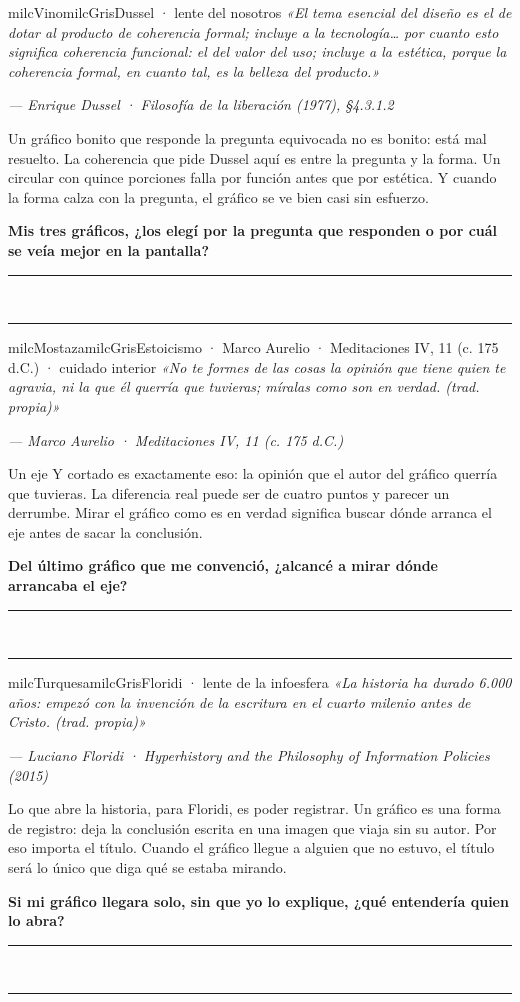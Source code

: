 \documentclass[11pt,letterpaper]{article}
\newcommand{\linead}[1]{\noindent\color{milcLinea}\rule{#1}{0.5pt}\color{milcNegro}}
\begin{document}
\begin{softbox}{milcVino}{milcGris}{Dussel · lente del nosotros}
\textit{«El tema esencial del diseño es el de dotar al producto de coherencia formal; incluye a la tecnología… por cuanto esto significa coherencia funcional: el del valor del uso; incluye a la estética, porque la coherencia formal, en cuanto tal, es la belleza del producto.»}

{\footnotesize\itshape\color{milcNegro!70}--- Enrique Dussel · Filosofía de la liberación (1977), §4.3.1.2}

Un gráfico bonito que responde la pregunta equivocada no es bonito: está mal resuelto. La coherencia que pide Dussel aquí es entre la pregunta y la forma. Un circular con quince porciones falla por función antes que por estética. Y cuando la forma calza con la pregunta, el gráfico se ve bien casi sin esfuerzo.

\textbf{Mis tres gráficos, ¿los elegí por la pregunta que responden o por cuál se veía mejor en la pantalla?}
\end{softbox}
\linead{\linewidth}\\[1mm]
\linead{\linewidth}

\begin{softbox}{milcMostaza}{milcGris}{Estoicismo · Marco Aurelio · Meditaciones IV, 11 (c. 175 d.C.) · cuidado interior}
\textit{«No te formes de las cosas la opinión que tiene quien te agravia, ni la que él querría que tuvieras; míralas como son en verdad. (trad. propia)»}

{\footnotesize\itshape\color{milcNegro!70}--- Marco Aurelio · Meditaciones IV, 11 (c. 175 d.C.)}

Un eje Y cortado es exactamente eso: la opinión que el autor del gráfico querría que tuvieras. La diferencia real puede ser de cuatro puntos y parecer un derrumbe. Mirar el gráfico como es en verdad significa buscar dónde arranca el eje antes de sacar la conclusión.

\textbf{Del último gráfico que me convenció, ¿alcancé a mirar dónde arrancaba el eje?}
\end{softbox}
\linead{\linewidth}\\[1mm]
\linead{\linewidth}

\begin{softbox}{milcTurquesa}{milcGris}{Floridi · lente de la infoesfera}
\textit{«La historia ha durado 6.000 años: empezó con la invención de la escritura en el cuarto milenio antes de Cristo. (trad. propia)»}

{\footnotesize\itshape\color{milcNegro!70}--- Luciano Floridi · Hyperhistory and the Philosophy of Information Policies (2015)}

Lo que abre la historia, para Floridi, es poder registrar. Un gráfico es una forma de registro: deja la conclusión escrita en una imagen que viaja sin su autor. Por eso importa el título. Cuando el gráfico llegue a alguien que no estuvo, el título será lo único que diga qué se estaba mirando.

\textbf{Si mi gráfico llegara solo, sin que yo lo explique, ¿qué entendería quien lo abra?}
\end{softbox}
\linead{\linewidth}\\[1mm]
\linead{\linewidth}
\end{document}
